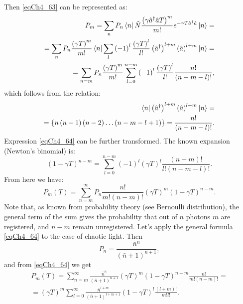 Then \eqref{eqCh4_63} can be represented as:
\begin{eqnarray}
P_m = \sum_n P_n 
\bra{n}
\hat{N}
\frac{\left(\gamma \hat{a}^{\dag} \hat{a} T\right)^m}{m!}
e^{- \gamma T \hat{a}^{\dag} \hat{a}}
\ket{n} = 
\nonumber \\
=
\sum_n P_n 
\frac{\left(\gamma T\right)^m}{m!}
\bra{n}
\sum_l\left(-1\right)^l
\frac{\left(\gamma T\right)^l}{l!}
\left(\hat{a}^{\dag}\right)^{l + m}
\left(\hat{a}\right)^{l + m}
\ket{n} = 
\nonumber \\
=
\sum_{n = m}
P_n 
\frac{\left(\gamma T\right)^m}{m!}
\sum_{l = 0}^{n - m}\left(-1\right)^l
\frac{\left(\gamma T\right)^l}{l!}
\frac{n!}{\left(n - m - l\right)!},
\label{eqCh4_64}
\end{eqnarray}
which follows from the relation:
\begin{eqnarray}
\bra{n}
\left(\hat{a}^{\dag}\right)^{l + m}
\left(\hat{a}\right)^{l + m}
\ket{n} = 
\nonumber \\
= \left\{
n \left(n - 1\right)\left(n - 2\right) \dotsc
\left(n - m - l + 1\right)
\right\} = 
\frac{n!}{\left(n - m - l\right)!}.
\nonumber
\end{eqnarray}
Expression \eqref{eqCh4_64} can be further transformed. The known expansion (Newton's binomial) is:
\[
\left(1 - \gamma T\right)^{n - m} = 
\sum_{l = 0}^{n -m}
\left(-1\right)^l
\left(\gamma T\right)^l
\frac{\left(n - m\right)!}{l!\left(n - m - l\right)!}.
\]
From here we have:
\begin{equation}
P_m\left(T\right) = 
\sum_{n = m}^{\infty}
P_n 
\frac{n!}{m!\left(n - m\right)!}
\left(\gamma T\right)^m
\left(1 - \gamma T\right)^{n - m}.
\label{eqCh4_64a}
\end{equation}
Note that, as known from probability theory (see Bernoulli distribution), the general term of the sum gives the probability that out of $n$
photons $m$ are registered, and $n - m$ remain
unregistered. Let's apply the general formula \eqref{eqCh4_64} to the case of
chaotic light. Then  
\[
P_n = \frac{\bar{n}^n}{\left(\bar{n} + 1\right)^{n + 1}},
\]
and from \eqref{eqCh4_64} we get 
\begin{eqnarray}
P_m\left(T\right) = 
\sum_{n = m}^{\infty}
\frac{\bar{n}^n}{\left(\bar{n} + 1\right)^{n + 1}}
\left(\gamma T\right)^m
\left(1 - \gamma T\right)^{n - m} 
\frac{n!}{m!\left(n - m\right)!}
=
\nonumber \\
=
\left(\gamma T\right)^m
\sum_{l = 0}^{\infty}
\frac{\bar{n}^{l + m}}{\left(\bar{n} + 1\right)^{l + m + 1}}
\left(1 - \gamma T\right)^{l}
\frac{\left(l + m\right)!}{m! l!}. 
\label{eqCh4_65}
\end{eqnarray}

